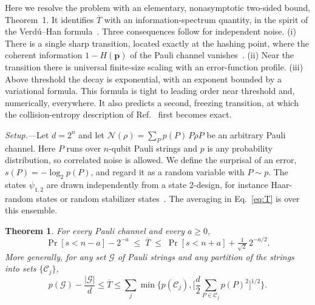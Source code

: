 \documentclass[aps,prl,twocolumn,superscriptaddress,amsmath,amssymb,10pt]{revtex4-2}
\newtheorem{theorem}{Theorem}
\newcommand{\Tb}{\overline{T}}
\newcommand{\N}{\mathcal{N}}
\begin{document}
Here we resolve the problem with an elementary, nonasymptotic two-sided bound, Theorem~1. It identifies $\Tb$ with an information-spectrum quantity, in the spirit of the Verd\'u--Han formula~\cite{VerduHan,HayashiNagaoka}. Three consequences follow for independent noise. (i) There is a single sharp transition, located exactly at the hashing point, where the coherent information $1-H(\bm p)$ of the Pauli channel vanishes~\cite{BDSW,Devetak}. (ii) Near the transition there is universal finite-size scaling with an error-function profile. (iii) Above threshold the decay is exponential, with an exponent bounded by a variational formula. This formula is tight to leading order near threshold and, numerically, everywhere. It also predicts a second, freezing transition, at which the collision-entropy description of Ref.~\cite{Liu2026} first becomes exact.

\emph{Setup.}---Let $d=2^n$ and let $\N(\rho)=\sum_P p(P)\,P\rho P$ be an arbitrary Pauli channel. Here $P$ runs over $n$-qubit Pauli strings and $p$ is any probability distribution, so correlated noise is allowed. We define the surprisal of an error, $s(P)=-\log_2 p(P)$, and regard it as a random variable with $P\sim p$. The states $\psi_{1,2}$ are drawn independently from a state 2-design, for instance Haar-random states or random stabilizer states~\cite{Webb,Zhu}. The averaging in Eq.~\eqref{eq:T} is over this ensemble.

\begin{theorem}
For every Pauli channel and every $a\ge 0$,
\begin{equation}
\Pr[s<n-a]-2^{-a}\;\le\;\Tb\;\le\;\Pr[s<n+a]+\tfrac{1}{\sqrt2}\,2^{-a/2}.
\label{eq:thm}
\end{equation}
More generally, for any set $\mathcal G$ of Pauli strings and any partition of the strings into sets $\{\mathcal C_j\}$,
\begin{equation}
p(\mathcal G)-\frac{|\mathcal G|}{d}\le\Tb\le\sum_j\min\Big\{p(\mathcal C_j),\Big[\frac d2\sum_{P\in\mathcal C_j}p(P)^2\Big]^{1/2}\Big\}.
\label{eq:thm2}
\end{equation}
\end{theorem}
\end{document}
